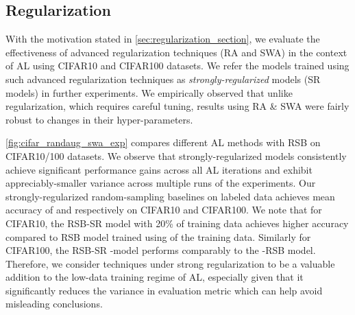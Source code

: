 \documentclass[10pt,twocolumn,letterpaper]{article}
\begin{document}
\subsection{Regularization} \label{Regularization}
With the motivation stated in \cref{sec:regularization_section}, we evaluate the effectiveness of advanced regularization techniques (RA and SWA) in the context of AL using CIFAR10 and CIFAR100 datasets. We refer the models trained using such advanced regularization techniques as \textit{strongly-regularized} models (SR models) in further experiments.
We empirically observed that unlike regularization, which requires careful tuning, results using RA \& SWA were fairly robust to changes in their hyper-parameters.


\cref{fig:cifar_randaug_swa_exp} compares different AL methods with RSB on CIFAR10/100 datasets. We observe that strongly-regularized models consistently achieve significant performance gains across all AL iterations and exhibit appreciably-smaller variance across multiple runs of the experiments. Our strongly-regularized random-sampling baselines on  labeled data achieves mean accuracy of  and  respectively on CIFAR10 and CIFAR100. We note that for CIFAR10, the RSB-SR model with 20\% of training data achieves  higher accuracy compared to RSB model trained using  of the training data. Similarly for CIFAR100, the RSB-SR -model performs comparably to the -RSB model. Therefore, we consider techniques under strong regularization to be a valuable addition to the low-data training regime of AL, especially given that it significantly reduces the variance in evaluation metric which can help avoid misleading conclusions.
\end{document}

